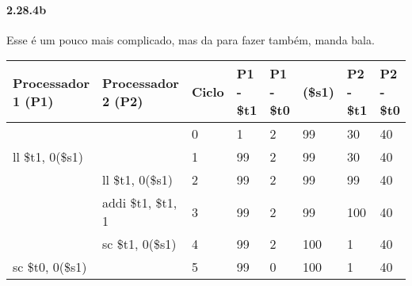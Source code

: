 \documentclass{article}
\begin{document}
\paragraph{2.28.4b} Esse é um pouco mais complicado, mas da para fazer também, 
manda bala.

\begin{table}[ht!]
\centering
\begin{tabular}{|l|l|l|l|l|l|l|l|}

\hline Processador 1 (P1) &
       Processador 2 (P2) &
       Ciclo              &
       P1 - \$t1          &
       P1 - \$t0          &
       (\$s1)             &
       P2 - \$t1          &
       P2 - \$t0          \\

\hline                   &                    & 0 & 1   & 2 & 99  & 30  & 40 \\
\hline  ll \$t1, 0(\$s1) &                    & 1 & 99  & 2 & 99  & 30  & 40 \\
\hline                   & ll \$t1, 0(\$s1)   & 2 & 99  & 2 & 99  & 99  & 40 \\
\hline                   & addi \$t1, \$t1, 1 & 3 & 99  & 2 & 99  & 100 & 40 \\
\hline                   & sc \$t1, 0(\$s1)   & 4 & 99  & 2 & 100 & 1   & 40 \\
\hline sc \$t0, 0(\$s1)  &                    & 5 & 99  & 0 & 100 & 1   & 40 \\
\hline
\end{tabular} 
\end{table}
\end{document}
